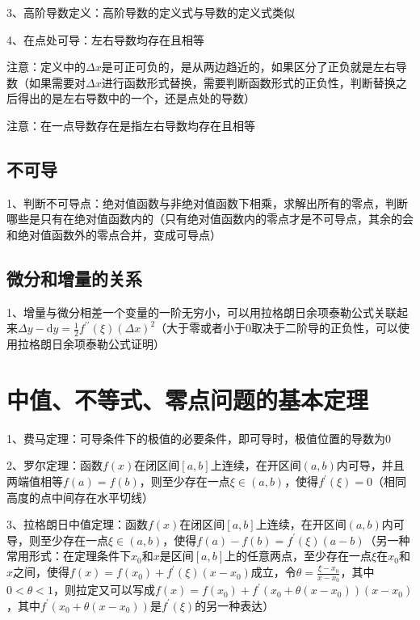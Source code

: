 3、高阶导数定义：高阶导数的定义式与导数的定义式类似

4、在点处可导：左右导数均存在且相等

注意：定义中的$\Delta x$是可正可负的，是从两边趋近的，如果区分了正负就是左右导数（如果需要对$\Delta x$进行函数形式替换，需要判断函数形式的正负性，判断替换之后得出的是左右导数中的一个，还是点处的导数）

注意：在一点导数存在是指左右导数均存在且相等



\subsection{不可导}

1、判断不可导点：绝对值函数与非绝对值函数下相乘，求解出所有的零点，判断哪些是只有在绝对值函数内的（只有绝对值函数内的零点才是不可导点，其余的会和绝对值函数外的零点合并，变成可导点）



\subsection{微分和增量的关系}

1、增量与微分相差一个变量的一阶无穷小，可以用拉格朗日余项泰勒公式关联起来$\Delta y-\mathrm{d} y=\frac{1}{2} f^{\prime \prime}(\xi)(\Delta x)^{2}$（大于零或者小于0取决于二阶导的正负性，可以使用拉格朗日余项泰勒公式证明）

\section{中值、不等式、零点问题的基本定理}

1、费马定理：可导条件下的极值的必要条件，即可导时，极值位置的导数为0

2、罗尔定理：函数$f(x)$在闭区间$[a,b]$上连续，在开区间$(a,b)$内可导，并且两端值相等$f(a)=f(b)$，则至少存在一点$\xi \in(a, b)$，使得$f^{\prime}(\xi)=0$（相同高度的点中间存在水平切线）

3、拉格朗日中值定理：函数$f(x)$在闭区间$[a,b]$上连续，在开区间$(a,b)$内可导，则至少存在一点$\xi \in(a, b)$，使得$f(a)-f(b)=f^{\prime}(\xi)(a-b)$（另一种常用形式：在定理条件下$x_0$和$x$是区间$[a,b]$上的任意两点，至少存在一点$\xi$在$x_0$和$x$之间，使得$f(x)=f\left(x_{0}\right)+f^{\prime}(\xi)\left(x-x_{0}\right)$成立，令$\theta = \frac{\xi - x_0}{x-x_0}$，其中$0< \theta < 1$，则拉定又可以写成$f(x)=f\left(x_{0}\right)+f^{\prime}\left(x_{0}+\theta\left(x-x_{0}\right)\right)\left(x-x_{0}\right)$，其中$f^{\prime}\left(x_{0}+\theta\left(x-x_{0}\right)\right)$是$f^{\prime}(\xi)$的另一种表达）

